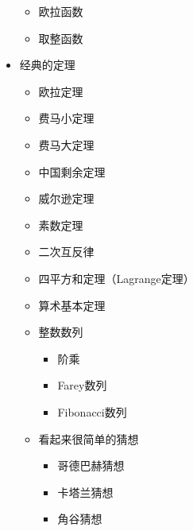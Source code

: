 \documentclass{ctexrep}
\begin{document}
\begin{itemize}
\begin{itemize}
  \item 欧拉函数
  \item 取整函数
  \end{itemize}
\item 经典的定理
  \begin{itemize}
  \item 欧拉定理
  \item 费马小定理
  \item 费马大定理
  \item 中国剩余定理
  \item 威尔逊定理
  \item 素数定理
  \item 二次互反律
  \item 四平方和定理（Lagrange定理）
  \item 算术基本定理
  \item 整数数列
    \begin{itemize}
    \item 阶乘
    \item Farey数列
    \item Fibonacci数列
    \end{itemize}
  \item 看起来很简单的猜想
    \begin{itemize}
    \item 哥德巴赫猜想
    \item 卡塔兰猜想
    \item 角谷猜想
    \end{itemize}
  \end{itemize}
\end{itemize}
\end{document}
